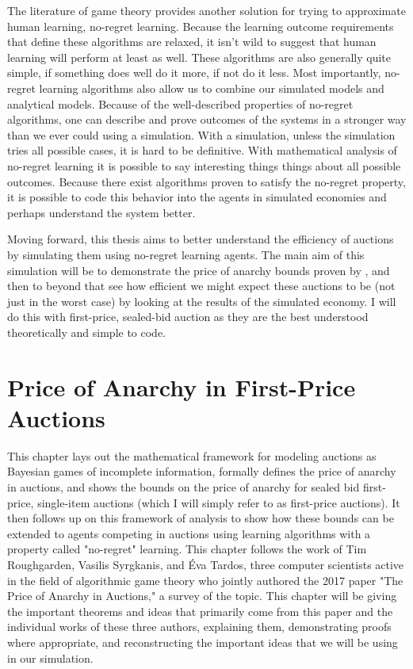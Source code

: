 \documentclass[12pt,twoside]{reedthesis}
\begin{document}

The literature of game theory provides another solution for trying to approximate human learning, no-regret learning. Because the learning outcome requirements that define these algorithms are relaxed, it isn't wild to suggest that human learning will perform at least as well. These algorithms are also generally quite simple, if something does well do it more, if not do it less. Most importantly, no-regret learning algorithms also allow us to combine our simulated models and analytical models. Because of the well-described properties of no-regret algorithms, one can describe and prove outcomes of the systems in a stronger way than we ever could using a simulation. With a simulation, unless the simulation tries all possible cases, it is hard to be definitive. With mathematical analysis of no-regret learning it is possible to say interesting things things about all possible outcomes. Because there exist algorithms proven to satisfy the no-regret property, it is possible to code this behavior into the agents in simulated economies and perhaps understand the system better.

Moving forward, this thesis aims to better understand the efficiency of auctions by simulating them using no-regret learning agents. The main aim of this simulation will be to demonstrate the price of anarchy bounds proven by \cite{Roughgarden2017}, and then to beyond that see how efficient we might expect these auctions to be (not just in the worst case) by looking at the results of the simulated economy. I will do this with first-price, sealed-bid auction as they are the best understood theoretically and simple to code.

\chapter{Price of Anarchy in First-Price Auctions}
This chapter lays out the mathematical framework for modeling auctions as Bayesian games of incomplete information, formally defines the price of anarchy in auctions, and shows the bounds on the price of anarchy for sealed bid first-price, single-item auctions (which I will simply refer to as first-price auctions). It then follows up on this framework of analysis to show how these bounds can be extended to agents competing in auctions using learning algorithms with a property called "no-regret" learning. This chapter follows the work of Tim Roughgarden, Vasilis Syrgkanis, and \'Eva Tardos, three computer scientists active in the field of algorithmic game theory who jointly authored the 2017 paper "The Price of Anarchy in Auctions," a survey of the topic. This chapter will be giving the important theorems and ideas that primarily come from this paper and the individual works of these three authors, explaining them, demonstrating proofs where appropriate, and reconstructing the important ideas that we will be using in our simulation. 
\end{document}
